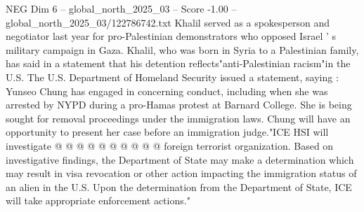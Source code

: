 \begin{textsample}{NEG Dim 6 – global\_north\_2025\_03 – Score -1.00 – global\_north\_2025\_03/122786742.txt}
Khalil served as a spokesperson and negotiator last year for pro-Palestinian demonstrators who opposed Israel ' s military campaign in Gaza.
Khalil, who was born in Syria to a Palestinian family, has said in a statement that his detention reflects"anti-Palestinian racism"in the U.S.
The U.S.
Department of Homeland Security issued a statement, saying : Yunseo Chung has engaged in concerning conduct, including when she was arrested by NYPD during a pro-Hamas protest at Barnard College.
She is being sought for removal proceedings under the immigration laws.
Chung will have an opportunity to present her case before an immigration judge."ICE HSI will investigate @ @ @ @ @ @ @ @ @ @ foreign terrorist organization.
Based on investigative findings, the Department of State may make a determination which may result in visa revocation or other action impacting the immigration status of an alien in the U.S.
Upon the determination from the Department of State, ICE will take appropriate enforcement actions."

\end{textsample}
